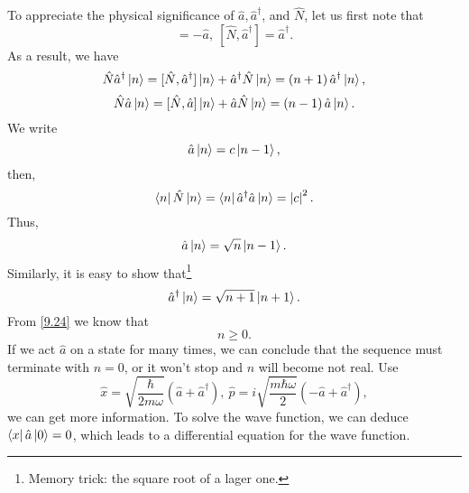 \documentclass{article}
\theoremstyle{1}
\begin{document}
To appreciate the physical significance of $\hat{a},\hat{a}^\dagger$, and $\hat{N}$, let us first note that 
\begin{equation}
    [\hat{N},\hat{a}]=-\hat{a},\ [\hat{N},\hat{a}^\dagger]=\hat{a}^\dagger.
\end{equation}
As a result, we have
\begin{equation}
    \hat{N}\hat{a}^\dagger\ket{n}=[\hat{N},\hat{a}^\dagger]\ket{n}+\hat{a}^\dagger\hat{N}\ket{n}=\left(n+1\right)\hat{a}^\dagger\ket{n},
\end{equation}
\begin{equation}
    \hat{N}\hat{a}\ket{n}=[\hat{N},\hat{a}]\ket{n}+\hat{a}\hat{N}\ket{n}=\left(n-1\right)\hat{a}\ket{n}.
\end{equation}
We write
\begin{equation}
    \hat{a}\ket{n}=c\ket{n-1},
\end{equation}
then, 
\begin{equation}\label{9.24}
    \bra{n}\hat{N}\ket{n}=\bra{n}\hat{a}^\dagger\hat{a}\ket{n}=\left|c\right|^2.
\end{equation}
Thus, 
\begin{equation}
    \hat{a}\ket{n}=\sqrt{n}\ket{n-1}.
\end{equation}
Similarly, it is easy to show that\footnote{Memory trick: the square root of a lager one.}
\begin{equation}
    \hat{a}^\dagger\ket{n}=\sqrt{n+1}\ket{n+1}.
\end{equation}
From \eqref{9.24} we know that 
\begin{equation}
    n\ge0.
\end{equation}
If we act $\hat{a}$ on a state for many times, we can conclude that the sequence must
terminate with $n=0$, or it won't stop and $n$ will become not real.
Use 
\begin{equation}
    \hat{x}=\sqrt{\frac{\hbar}{2m\omega}}\left(\hat{a}+\hat{a}^\dagger\right),\ \hat{p}=i\sqrt{\frac{m\hbar\omega}{2}}\left(-\hat{a}+\hat{a}^\dagger\right),
\end{equation}
we can get more information. To solve the wave function, we can deduce $\bra{x}\hat{a}\ket{0}=0$, which leads to a differential equation for the wave function.
\end{document}
